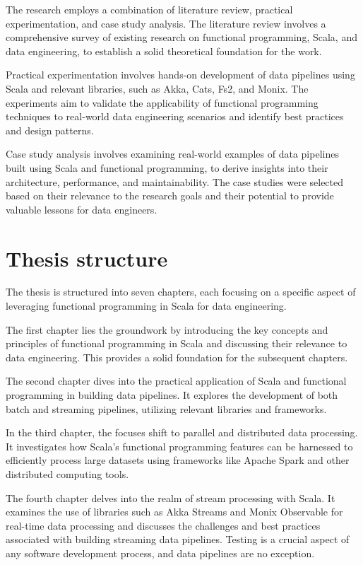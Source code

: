 The research employs a combination of literature review, practical experimentation, and case study analysis. The literature review involves a comprehensive survey of existing research on functional programming, Scala, and data engineering, to establish a solid theoretical foundation for the work.

Practical experimentation involves hands-on development of data pipelines using Scala and relevant libraries, such as Akka, Cats, Fs2, and Monix. The experiments aim to validate the applicability of functional programming techniques to real-world data engineering scenarios and identify best practices and design patterns.

Case study analysis involves examining real-world examples of data pipelines built using Scala and functional programming, to derive insights into their architecture, performance, and maintainability. The case studies were selected based on their relevance to the research goals and their potential to provide valuable lessons for data engineers.

\section*{Thesis structure}

The thesis is structured into seven chapters, each focusing on a specific aspect of leveraging functional programming in Scala for data engineering.

The first chapter lies the groundwork by introducing the key concepts and principles of functional programming in Scala and discussing their relevance to data engineering. This provides a solid foundation for the subsequent chapters.

The second chapter dives into the practical application of Scala and functional programming in building data pipelines. It explores the development of both batch and streaming pipelines, utilizing relevant libraries and frameworks. 

In the third chapter, the focuses shift to parallel and distributed data processing. It investigates how Scala's functional programming features can be harnessed to efficiently process large datasets using frameworks like Apache Spark and other distributed computing tools.

The fourth chapter delves into the realm of stream processing with Scala. It examines the use of libraries such as Akka Streams and Monix Observable for real-time data processing and discusses the challenges and best practices associated with building streaming data pipelines. Testing is a crucial aspect of any software development process, and data pipelines are no exception.

